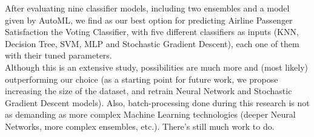 After evaluating nine classifier models, including two ensembles and a model given by AutoML,
we find as our best option for predicting Airline Passenger Satisfaction the Voting Classifier,
with five different classifiers as inputs (KNN, Decision Tree, SVM, MLP and Stochastic Gradient Descent),
each one of them with their tuned parameters.\\
Although this is an extensive study, possibilities are much more and (most likely) outperforming our choice (as a starting point for future work, we propose increasing the size of the dataset, and retrain Neural Network and Stochastic Gradient Descent models).
Also, batch-processing done during this research is not as demanding as more complex Machine Learning technologies
(deeper Neural Networks, more complex ensembles, etc.). There's still much work to do.
